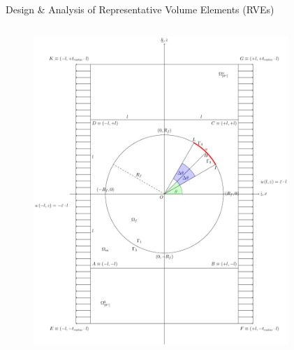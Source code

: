 \documentclass[final]{beamer}
\begin{document}
\begin{frame}
\begin{center}
\begin{minipage}{\textwidth}
\begin{exampleblock}{\rule[-0.6ex]{0pt}{50pt}\centering\LARGE Design \& Analysis of Representative Volume Elements (RVEs)}
\begin{columns}
\begin{column}{0.125\textwidth}
\begin{figure}[!h]
\centering
   \includegraphics[width=\columnwidth]{boundedRVE_cc.pdf}
\end{figure}
\end{column}
\begin{column}{0.15\textwidth}
\begin{figure}[!h]
\centering

\end{figure}
\end{column}
\end{columns}
\end{exampleblock}
\end{minipage}
\end{center}
\end{frame}
\end{document}

